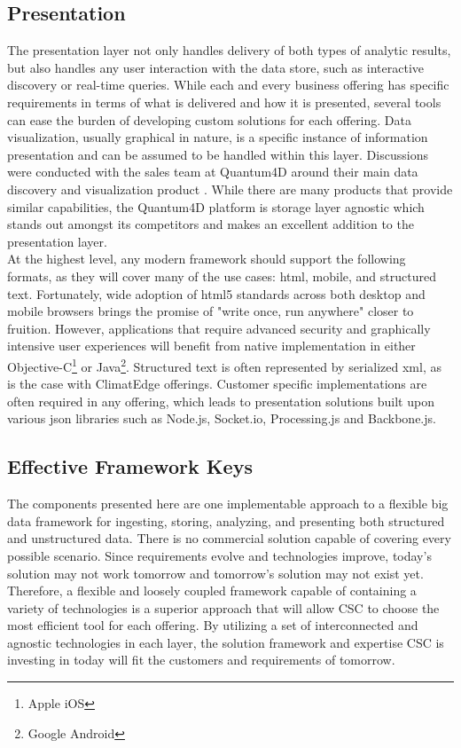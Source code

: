 \subsection{Presentation}
The presentation layer not only handles delivery of both types of analytic results, but also handles any user interaction with the data store, such as interactive discovery or real-time queries. While each and every business offering has specific requirements in terms of what is delivered and how it is presented, several tools can ease the burden of developing custom solutions for each offering. Data visualization, usually graphical in nature, is a specific instance of information presentation and can be assumed to be handled within this layer. Discussions were conducted with the sales team at Quantum4D around their main data discovery and visualization product \cite{quantum}. While there are many products that provide similar capabilities, the Quantum4D platform is storage layer agnostic which stands out amongst its competitors and makes an excellent addition to the presentation layer.\\

At the highest level, any modern framework should support the following formats, as they will cover many of the use cases: \gls{html}, mobile, and structured text. Fortunately, wide adoption of \gls{html}5 standards across both desktop and mobile browsers brings the promise of "write once, run anywhere" closer to fruition. However, applications that require advanced security and graphically intensive user experiences will benefit from native implementation in either Objective-C\footnote{Apple iOS} or Java\footnote{Google Android}. Structured text is often represented by serialized \gls{xml}, as is the case with ClimatEdge offerings. Customer specific implementations are often required in any offering, which leads to presentation solutions built upon various \gls{json} libraries such as Node.js, Socket.io, Processing.js and Backbone.js.
\subsection{Effective Framework Keys}
The components presented here are one implementable approach to a flexible big data framework for ingesting, storing, analyzing, and presenting both structured and unstructured data. There is no commercial solution capable of covering every possible scenario. Since requirements evolve and technologies improve, today's solution may not work tomorrow and tomorrow's solution may not exist yet. Therefore, a flexible and loosely coupled framework capable of containing a variety of technologies is a superior approach that will allow \textsc{CSC} to choose the most efficient tool for each offering. By utilizing a set of interconnected and agnostic technologies in each layer, the solution framework and expertise \textsc{CSC} is investing in today will fit the customers and requirements of tomorrow.
